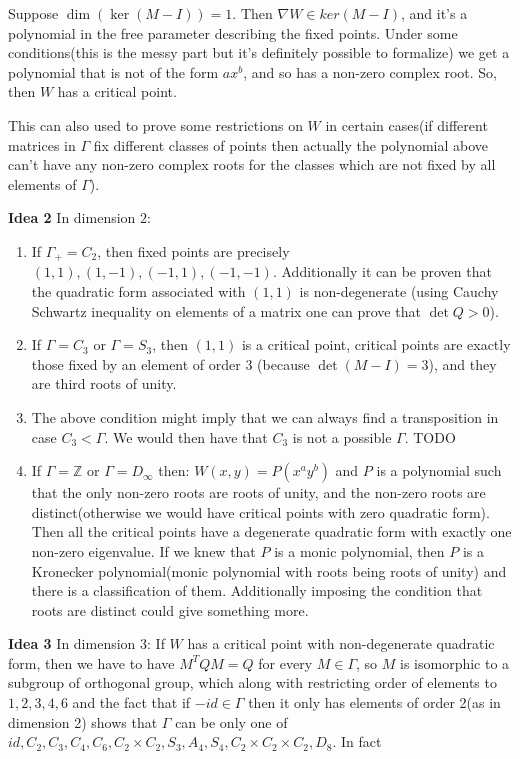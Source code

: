 \documentclass[a4paper]{article}
\begin{document}
Suppose $\dim (\ker(M-I))=1$. Then $\nabla W \in ker(M-I)$, and it's a polynomial in the free parameter describing the fixed points. Under some conditions(this is the messy part but it's definitely possible to formalize) we get a polynomial that is not of the form $a x^b$, and so has a non-zero complex root. So, then $W$ has a critical point.

This can also used to prove some restrictions on $W$ in certain cases(if different matrices in $\Gamma$ fix different classes of points then actually the polynomial above can't have any non-zero complex roots for the classes which are not fixed by all elements of $\Gamma$).

\textbf{Idea 2}
In dimension $2$:
\begin{enumerate}
	\item If $\Gamma_+ = C_2$, then fixed points are precisely $(1,1), (1,-1), (-1,1), (-1, -1)$. Additionally it can be proven that the quadratic form associated with $(1,1)$ is non-degenerate (using Cauchy Schwartz inequality on elements of a matrix one can prove that $\det Q > 0$).
	\item If $\Gamma = C_3$ or $\Gamma = S_3$, then $(1,1)$ is a critical point, critical points are exactly those fixed by an element of order $3$ (because $\det(M-I) = 3$), and they are third roots of unity.
	\item The above condition might imply that we can always find a transposition in case $C_3 < \Gamma$. We would then have that $C_3$ is not a possible $\Gamma$. TODO
	\item If $\Gamma = \mathbb{Z}$ or $\Gamma = D_\infty$ then:
	$W(x, y) = P(x^a y^b)$ and $P$ is a polynomial such that the only non-zero roots are roots of unity, and the non-zero roots are distinct(otherwise we would have critical points with zero quadratic form). Then all the critical points have a degenerate quadratic form with exactly one non-zero eigenvalue.
	If we knew that $P$ is a monic polynomial, then $P$ is a Kronecker polynomial(monic polynomial with roots being roots of unity) and there is a classification of them. Additionally imposing the condition that roots are distinct could give something more.
\end{enumerate}
\textbf{Idea 3}
In dimension 3:
If $W$ has a critical point with non-degenerate quadratic form, then we have to have $M^T Q M = Q$ for every $M \in \Gamma$, so $M$ is isomorphic to a subgroup of orthogonal group, which along with restricting order of elements to $1,2,3,4,6$ and the fact that if $-id \in \Gamma$ then it only has elements of order 2(as in dimension 2) shows that $\Gamma$ can be only one of $id, C_2, C_3, C_4, C_6, C_2 \times C_2, S_3, A_4, S_4, C_2 \times C_2 \times C_2, D_8$. In fact
\end{document}
